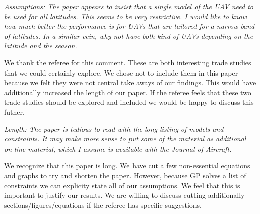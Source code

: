 \documentclass[10pt, a4paper]{article}
\begin{document}
\emph{Assumptions:
The paper appears to insist that a single model of the UAV need to be used for all latitudes. This seems to be very restrictive. I would like to know how much better the performance is for UAVs that are tailored for a narrow band of latitudes.
In a similar vein, why not have both kind of UAVs depending on the latitude and the season.
}

We thank the referee for this comment.  These are both interesting trade studies that we could certainly explore.  We chose not to include them in this paper because we felt they were not central take aways of our findings.  This would have additionally increased the length of our paper.  If the referee feels that these two trade studies should be explored and included we would be happy to discuss this futher.

\emph{Length: The paper is tedious to read with the long listing of models and constraints. It may make more sense to put some of the material as additional on-line material, which I assume is available with the Journal of Aircraft.}

We recognize that this paper is long.  We have cut a few non-essential equations and graphs to try and shorten the paper.  However, because GP solves a list of constraints we can explicity state all of our assumptions.  We feel that this is important to justify our results.  We are willing to discuss cutting additionally sections/figures/equations if the referee has specific suggestions.
\end{document}
